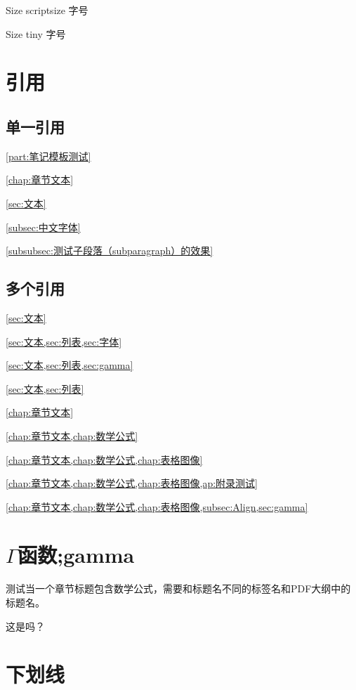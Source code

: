 {\scriptsize Size scriptsize 字号}

{\tiny Size tiny 字号}

\section{引用}

\subsection{单一引用}
\cref{part:笔记模板测试}

\cref{chap:章节文本}

\cref{sec:文本}

\cref{subsec:中文字体}

\cref{subsubsec:测试子段落（subparagraph）的效果}

\subsection{多个引用}
\cref{sec:文本}

\cref{sec:文本,sec:列表,sec:字体}

\cref{sec:文本,sec:列表,sec:gamma}

\cref{sec:文本,sec:列表}

\cref{chap:章节文本}

\cref{chap:章节文本,chap:数学公式}

\cref{chap:章节文本,chap:数学公式,chap:表格图像}

\cref{chap:章节文本,chap:数学公式,chap:表格图像,ap:附录测试}

\cref{chap:章节文本,chap:数学公式,chap:表格图像,subsec:Align,sec:gamma}

\section[Γ 函数的短标题]{$\Gamma$函数;gamma}

测试当一个章节标题包含数学公式，需要和标题名不同的标签名和PDF大纲中的标题名。

这是吗？

\section{下划线}

